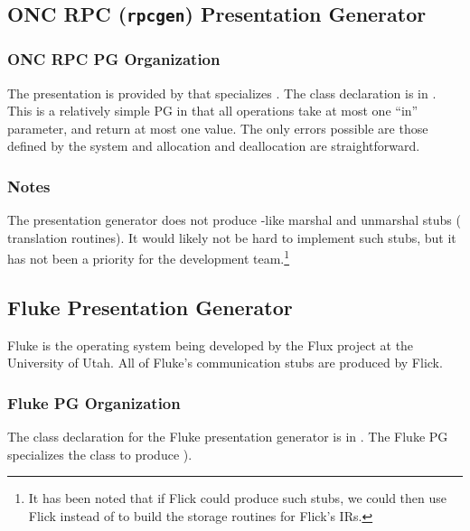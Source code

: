 \subsection{ONC RPC (\texttt{rpcgen}) Presentation Generator}
\label{subsec:PG:ONC RPC Presentation Generator}

\subsubsection{ONC RPC PG Organization}

The \ONCRPC{} presentation is provided by  that specializes
.  The class declaration is in .  This is a
relatively simple PG in that all operations take at most one ``in'' parameter,
and return at most one value.  The only errors possible are those defined by
the system and allocation and deallocation are straightforward.  

\subsubsection{Notes}

The \ONCRPC{} presentation generator does not produce \rpcgen{}-like marshal
and unmarshal stubs (\XDR{} translation routines).  It would likely not be hard
to implement such stubs, but it has not been a priority for the development
team.\footnote{It has been noted that if Flick could produce such stubs, we
could then use Flick instead of \rpcgen{} to build the storage routines for
Flick's IRs.}



\subsection{Fluke Presentation Generator}
\label{subsec:PG:Fluke Presentation Generator}

Fluke is the operating system being developed by the Flux project at the
University of Utah.  All of Fluke's communication stubs are produced by Flick.

\subsubsection{Fluke PG Organization}

The class declaration for the Fluke presentation generator is in
.  The Fluke PG specializes the
 class to produce ).

